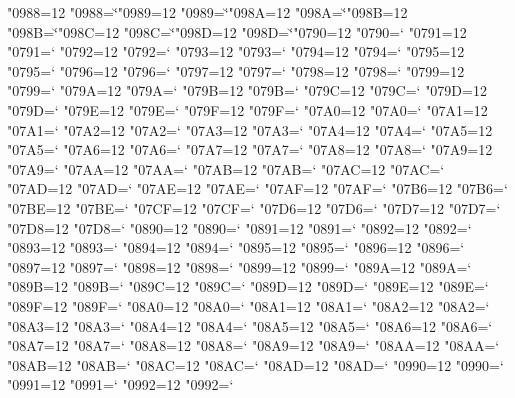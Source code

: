 \catcode"0988=12 \lccode"0988=`\u
\catcode"0989=12 \lccode"0989=`\u
\catcode"098A=12 \lccode"098A=`\u
\catcode"098B=12 \lccode"098B=`\u
\catcode"098C=12 \lccode"098C=`\u
\catcode"098D=12 \lccode"098D=`\u
\catcode"0790=12 \lccode"0790=`\w
\catcode"0791=12 \lccode"0791=`\w
\catcode"0792=12 \lccode"0792=`\w
\catcode"0793=12 \lccode"0793=`\w
\catcode"0794=12 \lccode"0794=`\w
\catcode"0795=12 \lccode"0795=`\w
\catcode"0796=12 \lccode"0796=`\w
\catcode"0797=12 \lccode"0797=`\w
\catcode"0798=12 \lccode"0798=`\w
\catcode"0799=12 \lccode"0799=`\w
\catcode"079A=12 \lccode"079A=`\w
\catcode"079B=12 \lccode"079B=`\w
\catcode"079C=12 \lccode"079C=`\w
\catcode"079D=12 \lccode"079D=`\w
\catcode"079E=12 \lccode"079E=`\w
\catcode"079F=12 \lccode"079F=`\w
\catcode"07A0=12 \lccode"07A0=`\w
\catcode"07A1=12 \lccode"07A1=`\w
\catcode"07A2=12 \lccode"07A2=`\w
\catcode"07A3=12 \lccode"07A3=`\w
\catcode"07A4=12 \lccode"07A4=`\w
\catcode"07A5=12 \lccode"07A5=`\w
\catcode"07A6=12 \lccode"07A6=`\w
\catcode"07A7=12 \lccode"07A7=`\w
\catcode"07A8=12 \lccode"07A8=`\w
\catcode"07A9=12 \lccode"07A9=`\w
\catcode"07AA=12 \lccode"07AA=`\w
\catcode"07AB=12 \lccode"07AB=`\w
\catcode"07AC=12 \lccode"07AC=`\w
\catcode"07AD=12 \lccode"07AD=`\w
\catcode"07AE=12 \lccode"07AE=`\w
\catcode"07AF=12 \lccode"07AF=`\w
\catcode"07B6=12 \lccode"07B6=`\w
\catcode"07BE=12 \lccode"07BE=`\w
\catcode"07CF=12 \lccode"07CF=`\w
\catcode"07D6=12 \lccode"07D6=`\w
\catcode"07D7=12 \lccode"07D7=`\w
\catcode"07D8=12 \lccode"07D8=`\w
\catcode"0890=12 \lccode"0890=`\w
\catcode"0891=12 \lccode"0891=`\w
\catcode"0892=12 \lccode"0892=`\w
\catcode"0893=12 \lccode"0893=`\w
\catcode"0894=12 \lccode"0894=`\w
\catcode"0895=12 \lccode"0895=`\w
\catcode"0896=12 \lccode"0896=`\w
\catcode"0897=12 \lccode"0897=`\w
\catcode"0898=12 \lccode"0898=`\w
\catcode"0899=12 \lccode"0899=`\w
\catcode"089A=12 \lccode"089A=`\w
\catcode"089B=12 \lccode"089B=`\w
\catcode"089C=12 \lccode"089C=`\w
\catcode"089D=12 \lccode"089D=`\w
\catcode"089E=12 \lccode"089E=`\w
\catcode"089F=12 \lccode"089F=`\w
\catcode"08A0=12 \lccode"08A0=`\w
\catcode"08A1=12 \lccode"08A1=`\w
\catcode"08A2=12 \lccode"08A2=`\w
\catcode"08A3=12 \lccode"08A3=`\w
\catcode"08A4=12 \lccode"08A4=`\w
\catcode"08A5=12 \lccode"08A5=`\w
\catcode"08A6=12 \lccode"08A6=`\w
\catcode"08A7=12 \lccode"08A7=`\w
\catcode"08A8=12 \lccode"08A8=`\w
\catcode"08A9=12 \lccode"08A9=`\w
\catcode"08AA=12 \lccode"08AA=`\w
\catcode"08AB=12 \lccode"08AB=`\w
\catcode"08AC=12 \lccode"08AC=`\w
\catcode"08AD=12 \lccode"08AD=`\w
\catcode"0990=12 \lccode"0990=`\w
\catcode"0991=12 \lccode"0991=`\w
\catcode"0992=12 \lccode"0992=`\w
